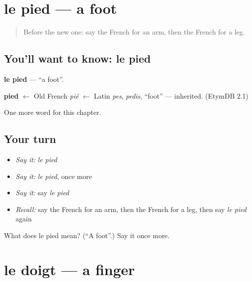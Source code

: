 \section[le pied]{le pied — a foot}

\label{lesson:FR-C49-pied}



\begin{quote}
Before the new one: say the French for an arm, then the French for a leg.
\end{quote}

\subsection*{You'll want to know: le pied}
\textbf{le pied} — \textquotedblleft{}a foot\textquotedblright{}.

\begin{cousinweb}
\textbf{pied} $\leftarrow$ Old French \emph{pié} $\leftarrow$ Latin \emph{pes}, \emph{pedis}, \textquotedblleft{}foot\textquotedblright{} — inherited. (EtymDB 2.1)
\end{cousinweb}

\begin{grammarlens}[title={What you've built}]
One more word for this chapter.
\end{grammarlens}

\subsection*{Your turn}
\begin{itemize}
\raggedright
  \item \emph{Say it:} \emph{le pied}
  \item \emph{Say it:} \emph{le pied}, once more
  \item \emph{Say it:} say \emph{le pied}
  \item \emph{Recall:} say the French for an arm, then the French for a leg, then say \emph{le pied} again
\end{itemize}

\begin{tcolorbox}[breakable,colback=teal!4,colframe=teal!35!black,title={Before you move on}]
What does le pied mean? (\textquotedblleft{}A foot\textquotedblright{}.) Say it once more.
\end{tcolorbox}
\section[le doigt]{le doigt — a finger}

